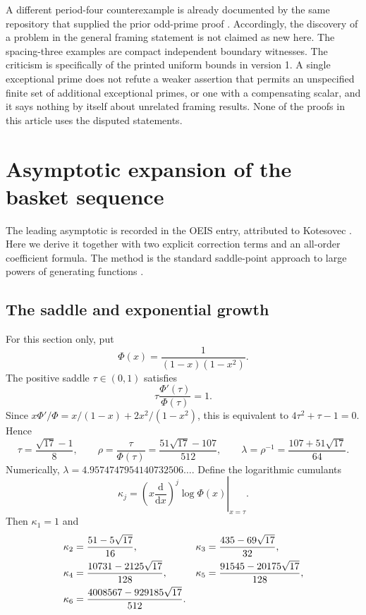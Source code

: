 \documentclass[11pt,a4paper]{article}
\numberwithin{equation}{section}
\theoremstyle{definition}
\theoremstyle{remark}
\begin{document}
A different period-four counterexample is already documented by the same
repository that supplied the prior odd-prime proof \cite{priorcounter}.
Accordingly, the discovery of a problem in the general framing statement is
not claimed as new here. The spacing-three examples are compact independent
boundary witnesses. The criticism is specifically of the printed uniform
bounds in version 1. A single exceptional prime does not refute a weaker
assertion that permits an unspecified finite set of additional exceptional
primes, or one with a compensating scalar, and it says nothing by itself
about unrelated framing results. None of the proofs in this article uses the
disputed statements.

\section{Asymptotic expansion of the basket sequence}
\label{sec:asymptotic}

The leading asymptotic is recorded in the OEIS entry, attributed to
Kotesovec \cite{oeis348410}. Here we derive it together with two explicit
correction terms and an all-order coefficient formula. The method is the
standard saddle-point approach to large powers of generating functions
\cite[Chapter VIII]{flajolet}.

\subsection{The saddle and exponential growth}
For this section only, put
\[
 \Phi(x)=\frac1{(1-x)(1-x^2)}.
\]
The positive saddle $\tau\in(0,1)$ satisfies
\[
 \tau\frac{\Phi'(\tau)}{\Phi(\tau)}=1.
\]
Since $x\Phi'/\Phi=x/(1-x)+2x^2/(1-x^2)$, this is equivalent to
$4\tau^2+\tau-1=0$. Hence
\begin{equation}\label{eq:saddle}
 \tau=\frac{\sqrt{17}-1}{8},\qquad
 \rho=\frac{\tau}{\Phi(\tau)}
 =\frac{51\sqrt{17}-107}{512},\qquad
 \lambda=\rho^{-1}=\frac{107+51\sqrt{17}}{64}.
\end{equation}
Numerically, $\lambda=4.9574747954140732506\ldots$.
Define the logarithmic cumulants
\begin{equation}\label{eq:kappa}
 \kappa_j=\left.
 \left(x\frac{\mathrm d}{\mathrm dx}\right)^j\log\Phi(x)
 \right|_{x=\tau}.
\end{equation}
Then $\kappa_1=1$ and
\begin{align}\label{eq:kappas}
 \kappa_2&=\frac{51-5\sqrt{17}}{16},&
 \kappa_3&=\frac{435-69\sqrt{17}}{32},\notag\\
 \kappa_4&=\frac{10731-2125\sqrt{17}}{128},&
 \kappa_5&=\frac{91545-20175\sqrt{17}}{128},\notag\\
 \kappa_6&=\frac{4008567-929185\sqrt{17}}{512}.&&
\end{align}
\end{document}

